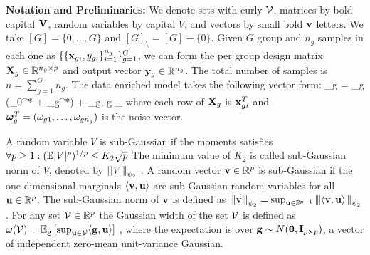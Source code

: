{\bf Notation and Preliminaries:}
We denote sets with curly ${\cal V}$, matrices by bold capital $\mathbf{V}$, random variables by capital $V$, and vectors by small bold $\mathbf{v}$ letters.
We take $[G] = \{0, \dots, G\}$ and $[G]_\setminus = [G] - \{0\}$.
Given $G$ group and $n_g$ samples in each one as $\{ \{\mathbf{x}_{gi}, y_{gi} \}_{i=1}^{n_g} \}_{g = 1}^G$, we can form the per group design matrix $\mathbf{X}_g \in \mathbb R^{n_g \times p}$ and output vector $\mathbf{y}_g \in \mathbb R ^{n_g}$.
The total number of samples is  $n = \sum_{g = 1}^{G} n_g$.
The data enriched model takes the following vector form:
\be
\label{eq:dirtymodel}
\y_g = \X_g (\bbeta _0^* + \bbeta _g^*) + \oomega_g,  \quad \forall g \in [G]_\setminus
\ee
where each row of $\mathbf{X}_g$ is $\mathbf{x}_{gi}^T$ and $\boldsymbol{\omega}_g^T = (\omega_{g1}, \dots, \omega_{gn_g})$ is the noise vector.

A random variable $V$ is sub-Gaussian if the moments satisfies $\forall p \geq 1: (\mathbb{E} |V|^p )^{1/p} \leq K_2 \sqrt{p}$
The minimum value of $K_2$ is called sub-Gaussian  norm of $V$, denoted by ${\left\vert\kern-0.25ex\left\vert\kern-0.25ex\left\vert V \right\vert\kern-0.25ex\right\vert\kern-0.25ex\right\vert}_{\psi_2}$ \cite{vers12}.
A random vector $\mathbf{v} \in \mathbb R^p$ is sub-Gaussian if the one-dimensional marginals $\langle \mathbf{v}, \mathbf{u} \rangle$ are sub-Gaussian random variables for all $\mathbf{u} \in \mathbb R^p$. The sub-Gaussian norm of $\mathbf{v}$ is defined \cite{vers12} as ${\left\vert\kern-0.25ex\left\vert\kern-0.25ex\left\vert \mathbf{v} \right\vert\kern-0.25ex\right\vert\kern-0.25ex\right\vert}_{\psi_2} = \sup_{\mathbf{u} \in \mathbb S^{p-1}} {\left\vert\kern-0.25ex\left\vert\kern-0.25ex\left\vert \langle \mathbf{v}, \mathbf{u} \rangle \right\vert\kern-0.25ex\right\vert\kern-0.25ex\right\vert}_{\psi_2}$.
For any set ${\cal V} \in \mathbb R^p$ the Gaussian width of the set ${\cal V}$ is defined as $\omega({\cal V}) = \mathbb{E}_{\mathbf{g}} \left[ \sup_{\mathbf{u} \in {\cal V}} \langle \mathbf{g}, \mathbf{u} \rangle \right]$ \cite{venkat12}, where the expectation is over $\mathbf{g} \sim N(\mathbf{0}, \mathbf{I}_{p \times p})$, a vector of independent zero-mean unit-variance Gaussian.



